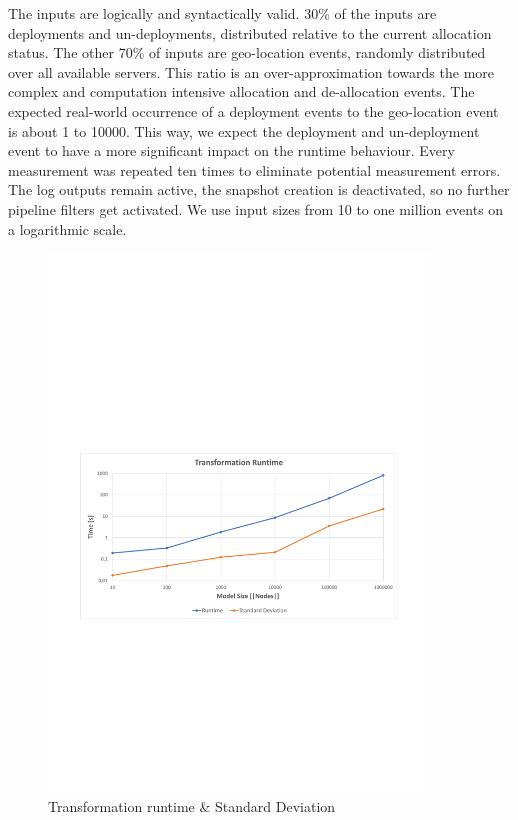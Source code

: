 The inputs are logically and syntactically valid. 30\% of the inputs are deployments and un-deployments, distributed relative to the current allocation status. The other 70\% of inputs are geo-location events, randomly distributed over all available servers. This ratio is an over-approximation towards the more complex and computation intensive allocation and de-allocation events. The expected real-world occurrence of a deployment events to the geo-location event is about 1 to 10000. This way, we expect the deployment and un-deployment event to have a more significant impact on the runtime behaviour. Every measurement was repeated ten times to eliminate potential measurement errors. The log outputs remain active, the snapshot creation is deactivated, so no further pipeline filters get activated. We use input sizes from 10 to one million events on a logarithmic scale.

\begin{figure}[h]
	\centering
	\includegraphics[trim = 10mm 90mm 10mm 110mm, clip, width=0.90\textwidth]{graphs/Runtime_Transformation}
	\caption{Transformation runtime \& Standard Deviation}
	\label{fig:eval:trans:runtime}
\end{figure}

